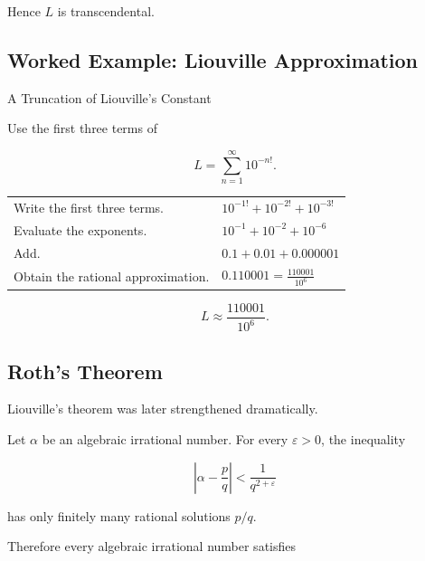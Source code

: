 Hence \(L\) is transcendental.

\subsection{Worked Example: Liouville Approximation}
\label{subsec:worked-liouville-approximation}

\begin{workedexamplebox}{A Truncation of Liouville's Constant}

Use the first three terms of

\[ L=\sum_{n=1}^{\infty}10^{-n!}. \]

\begin{tabularx}{\textwidth}{@{}>{\raggedright\arraybackslash}p{}X@{}}
Write the first three terms. &
\(10^{-1!}+10^{-2!}+10^{-3!}\)\\
Evaluate the exponents. &
\(10^{-1}+10^{-2}+10^{-6}\)\\
Add. &
\(0.1+0.01+0.000001\)\\
Obtain the rational approximation. &
\(0.110001=\frac{110001}{10^6}\)
\end{tabularx}

\begin{answerbox}
\[ \boxed{L\approx\frac{110001}{10^6}.} \]
\end{answerbox}
\end{workedexamplebox}

\subsection{Roth's Theorem}
\label{subsec:roth-theorem}

Liouville's theorem was later strengthened dramatically.

\begin{theorem}[Roth]
Let \(\alpha\) be an algebraic irrational number. For every
\(\varepsilon>0\), the inequality

\[ \boxed{\left|\alpha-\frac pq\right|<\frac1{q^{2+\varepsilon}}} \]

has only finitely many rational solutions \(p/q\).
\end{theorem}

Therefore every algebraic irrational number satisfies


